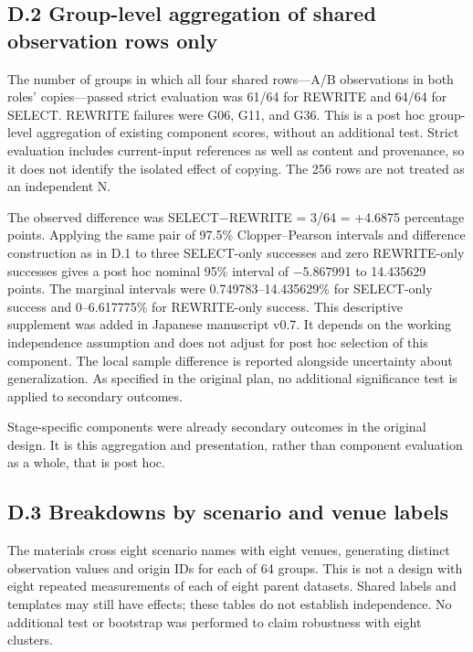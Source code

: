 \documentclass[10pt,a4paper]{article}
\begin{document}
\subsection{D.2 Group-level aggregation of shared observation rows only}\label{paper-01-d.2-group-level-aggregation-of-shared-observation-rows-only}

The number of groups in which all four shared rows---A/B observations in both roles' copies---passed strict evaluation was 61/64 for REWRITE and 64/64 for SELECT. REWRITE failures were G06, G11, and G36. This is a post hoc group-level aggregation of existing component scores, without an additional test. Strict evaluation includes current-input references as well as content and provenance, so it does not identify the isolated effect of copying. The 256 rows are not treated as an independent N.

The observed difference was SELECT−REWRITE = 3/64 = +4.6875 percentage points. Applying the same pair of 97.5\% Clopper--Pearson intervals and difference construction as in D.1 to three SELECT-only successes and zero REWRITE-only successes gives a post hoc nominal 95\% interval of −5.867991 to 14.435629 points. The marginal intervals were 0.749783--14.435629\% for SELECT-only success and 0--6.617775\% for REWRITE-only success. This descriptive supplement was added in Japanese manuscript v0.7. It depends on the working independence assumption and does not adjust for post hoc selection of this component. The local sample difference is reported alongside uncertainty about generalization. As specified in the original plan, no additional significance test is applied to secondary outcomes.

Stage-specific components were already secondary outcomes in the original design. It is this aggregation and presentation, rather than component evaluation as a whole, that is post hoc.

\subsection{D.3 Breakdowns by scenario and venue labels}\label{paper-01-d.3-breakdowns-by-scenario-and-venue-labels}

The materials cross eight scenario names with eight venues, generating distinct observation values and origin IDs for each of 64 groups. This is not a design with eight repeated measurements of each of eight parent datasets. Shared labels and templates may still have effects; these tables do not establish independence. No additional test or bootstrap was performed to claim robustness with eight clusters.
\end{document}
